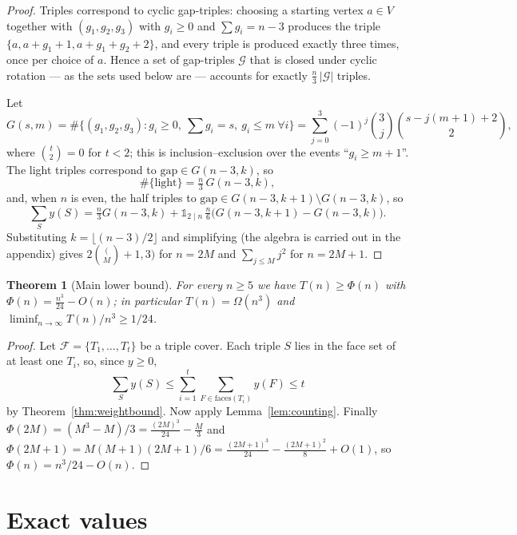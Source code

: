 \documentclass[11pt,a4paper]{article}
\newtheorem{theorem}{Theorem}[section]
\theoremstyle{definition}
\newcommand{\gap}{\mathrm{gap}}
\begin{document}
\begin{proof}
Triples correspond to cyclic gap-triples: choosing a starting vertex $a \in V$
together with $(g_1, g_2, g_3)$ with $g_i \ge 0$ and $\sum g_i = n-3$ produces
the triple $\{a, a+g_1+1, a+g_1+g_2+2\}$, and every triple is produced exactly
three times, once per choice of $a$. Hence a set of gap-triples $\mathcal{G}$
that is closed under cyclic rotation --- as the sets used below are --- accounts
for exactly $\frac{n}{3}\,|\mathcal{G}|$ triples.

Let
\[
G(s, m) = \#\{(g_1, g_2, g_3) : g_i \ge 0,\ \textstyle\sum g_i = s,\
  g_i \le m \ \forall i\} = \sum_{j=0}^{3} (-1)^{j}\binom{3}{j}\binom{s - j(m+1) + 2}{2},
\]
where $\binom{t}{2} = 0$ for $t < 2$; this is inclusion--exclusion over the events
``$g_i \ge m+1$''. The light triples correspond to $\gap \in G(n-3, k)$, so
\[
\#\{\text{light}\} = \tfrac{n}{3}\,G(n-3, k),
\]
and, when $n$ is even, the half triples to
$\gap \in G(n-3, k+1) \setminus G(n-3, k)$, so
\[
\sum_S y(S) = \tfrac{n}{3}G(n-3,k) + \mathbb{1}_{2 \mid n}\, \tfrac{n}{6}\big(G(n-3,k+1) - G(n-3,k)\big).
\]
Substituting $k = \lfloor (n-3)/2 \rfloor$ and simplifying (the algebra is
carried out in the appendix) gives $2\binom(M+1,3)$ for $n = 2M$ and
$\sum_{j \le M} j^2$ for $n = 2M+1$.
\end{proof}

\begin{theorem}[Main lower bound]\label{thm:main}
For every $n \ge 5$ we have $T(n) \ge \Phi(n)$ with
$\Phi(n) = \frac{n^3}{24} - O(n)$; in particular $T(n) = \Omega(n^3)$ and
$\liminf_{n \to \infty} T(n)/n^3 \ge 1/24$.
\end{theorem}

\begin{proof}
Let $\mathcal{F} = \{T_1, \dots, T_t\}$ be a triple cover. Each triple $S$ lies
in the face set of at least one $T_i$, so, since $y \ge 0$,
\[
\sum_S y(S) \le \sum_{i=1}^{t} \sum_{F \in \mathrm{faces}(T_i)} y(F) \le t
\]
by Theorem~\ref{thm:weightbound}. Now apply Lemma~\ref{lem:counting}. Finally
$\Phi(2M) = (M^3-M)/3 = \frac{(2M)^3}{24} - \frac{M}{3}$ and
$\Phi(2M+1) = M(M+1)(2M+1)/6 = \frac{(2M+1)^3}{24} - \frac{(2M+1)^2}{8} + O(1)$,
so $\Phi(n) = n^3/24 - O(n)$.
\end{proof}

\section{Exact values}\label{sec:exact}
\end{document}
